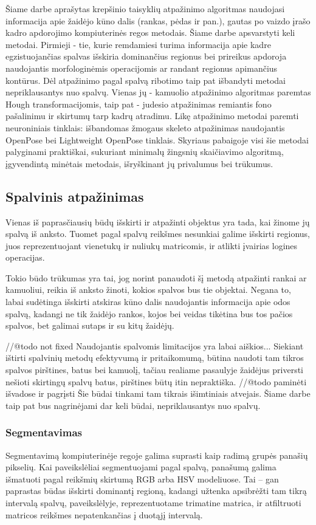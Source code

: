 \documentclass{VUMIFPSbakalaurinis}
\begin{document}
Šiame darbe aprašytas krepšinio taisyklių atpažinimo algoritmas naudojasi informacija apie žaidėjo kūno dalis (rankas, pėdas ir pan.), gautas po vaizdo įrašo kadro apdorojimo kompiuterinės regos metodais. Šiame darbe apsvarstyti keli metodai. Pirmieji - tie, kurie remdamiesi turima informacija apie kadre egzistuojančias spalvas išskiria dominančius regionus bei prireikus apdoroja naudojantis morfologinėmis operacijomis ar randant regionus apimančius kontūrus. Dėl atpažinimo pagal spalvą ribotimo taip pat išbandyti metodai nepriklausantys nuo spalvų. Vienas jų - kamuolio atpažinimo algoritmas paremtas Hough transformacijomis, taip pat - judesio atpažinimas remiantis fono pašalinimu ir skirtumų tarp kadrų atradimu. Likę atpažinimo metodai paremti neuroniniais tinklais: išbandomas žmogaus skeleto atpažinimas naudojantis OpenPose bei Lightweight OpenPose tinklais. Skyriaus pabaigoje visi šie metodai palyginami praktiškai, sukuriant minimalų žingsnių skaičiavimo algoritmą, įgyvendintą minėtais metodais, išryškinant jų privalumus bei trūkumus. 

\subsection{Spalvinis atpažinimas}
Vienas iš paprasčiausių būdų išskirti ir atpažinti objektus yra tada, kai žinome jų spalvą iš anksto. Tuomet pagal spalvų reikšmes nesunkiai galime išskirti regionus, juos reprezentuojant vienetukų ir nuliukų matricomis, ir atlikti įvairias logines operacijas. 

Tokio būdo trūkumas yra tai, jog norint panaudoti šį metodą atpažinti rankai ar kamuoliui, reikia iš anksto žinoti, kokios spalvos bus tie objektai. Negana to, labai sudėtinga išskirti atskiras kūno dalis naudojantis informacija apie odos spalvą, kadangi ne tik žaidėjo rankos, kojos bei veidas tikėtina bus tos pačios spalvos, bet galimai sutaps ir su kitų žaidėjų. 

//@todo not fixed Naudojantis spalvomis limitacijos yra labai aiškios... Siekiant ištirti spalvinių metodų efektyvumą ir pritaikomumą, būtina naudoti tam tikros spalvos pirštines, batus bei kamuolį, tačiau realiame pasaulyje žaidėjus priversti nešioti skirtingų spalvų batus, pirštines būtų itin nepraktiška. //@todo paminėti išvadose ir pagrįsti Šie būdai tinkami tam tikrais išimtiniais atvejais. Šiame darbe taip pat bus nagrinėjami dar keli būdai, nepriklausantys nuo spalvų. 
\subsubsection{Segmentavimas}
Segmentavimą kompiuterinėje regoje galima suprasti kaip radimą grupės panašių pikselių. Kai paveikslėliai segmentuojami pagal spalvą, panašumą galima išmatuoti pagal reikšmių skirtumą RGB arba HSV modeliuose. Tai – gan paprastas būdas išskirti dominantį regioną, kadangi užtenka apsibrėžti tam tikrą intervalą spalvų, paveikslėlyje, reprezentuotame trimatine matrica, ir atfiltruoti matricos reikšmes nepatenkančias į duotąjį intervalą. 
\end{document}
